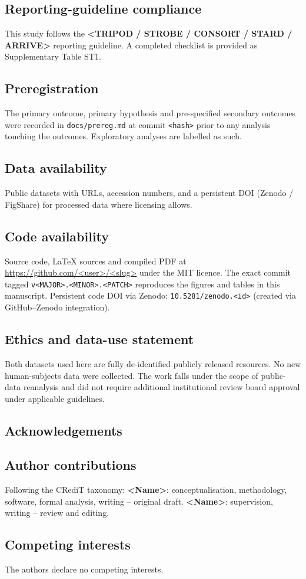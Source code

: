 \documentclass[11pt,a4paper]{article}
\begin{document}
\subsection*{Reporting-guideline compliance}
This study follows the \textbf{<TRIPOD / STROBE / CONSORT / STARD / ARRIVE>} reporting guideline. A completed checklist is provided as Supplementary Table ST1.

\subsection*{Preregistration}
The primary outcome, primary hypothesis and pre-specified secondary outcomes were recorded in \texttt{docs/prereg.md} at commit \texttt{<hash>} prior to any analysis touching the outcomes. Exploratory analyses are labelled as such.

\subsection*{Data availability}
Public datasets with URLs, accession numbers, and a persistent DOI (Zenodo / FigShare) for processed data where licensing allows.

\subsection*{Code availability}
Source code, LaTeX sources and compiled PDF at \url{https://github.com/<user>/<slug>} under the MIT licence. The exact commit tagged \texttt{v<MAJOR>.<MINOR>.<PATCH>} reproduces the figures and tables in this manuscript. Persistent code DOI via Zenodo: \texttt{10.5281/zenodo.<id>} (created via GitHub--Zenodo integration).

\subsection*{Ethics and data-use statement}
Both datasets used here are fully de-identified publicly released resources. No new human-subjects data were collected. The work falls under the scope of public-data reanalysis and did not require additional institutional review board approval under applicable guidelines.

\subsection*{Acknowledgements}
\subsection*{Author contributions}
Following the CRediT taxonomy: \textbf{<Name>}: conceptualisation, methodology, software, formal analysis, writing -- original draft. \textbf{<Name>}: supervision, writing -- review and editing.

\subsection*{Competing interests}
The authors declare no competing interests.



\end{document}

